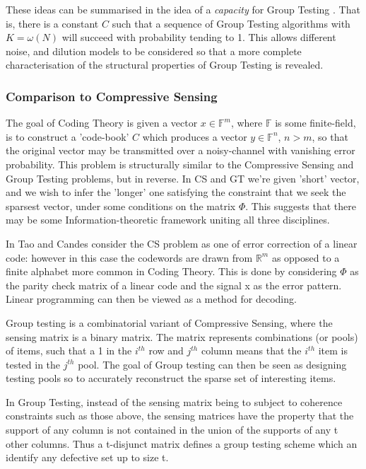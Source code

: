 \documentclass[conference]{IEEEtran}
\begin{document}
These ideas can be summarised in the idea of a \textit{capacity} for Group Testing \cite{Baldassini2013}. That is, there is a constant \(C\) such that a sequence of Group Testing algorithms with \( K = \omega\left(N\right)\) will succeed with probability tending to 1. This allows different noise, and dilution models to be considered so that a more complete characterisation of the structural properties of Group Testing is revealed.
 
\subsubsection{Comparison to Compressive Sensing}
The goal of Coding Theory is given a vector \(x \in \mathbb{F}^m\), where \(\mathbb{F}\) is some finite-field, is to construct a 'code-book' \(C\) which produces a vector \(y \in \mathbb{F}^n\), \(n > m\), so that the original vector may be transmitted over a noisy-channel with vanishing error probability. This problem is structurally similar to the Compressive Sensing and Group Testing problems, but in reverse. In CS and GT we're given 'short' vector, and we wish to infer the 'longer' one satisfying the constraint that we seek the sparsest vector, under some conditions on the matrix \(\Phi\). This suggests that there may be some Information-theoretic framework uniting all three disciplines. 

In \cite{Emma} Tao and Candes consider the CS problem as one of error correction of a linear code: however in this case the codewords are drawn from \(\mathbb{R}^m\) as opposed to a finite alphabet more common in Coding Theory. This is done by considering \(\Phi\) as the parity check matrix of a linear code and the signal x as the error pattern. Linear programming can then be viewed as a method for decoding. 

Group testing is a combinatorial variant of Compressive Sensing, where the sensing matrix is a binary matrix. The matrix represents combinations (or pools) of items, such that a 1 in the \(i^{th}\) row and \(j^{th}\) column means that  the \(i^{th}\) item is tested in the \(j^{th}\) pool. The goal of Group testing can then be seen as designing testing pools so to accurately reconstruct the sparse set of interesting items. 

In Group Testing, instead of the sensing matrix being to subject to coherence constraints such as those above, the sensing matrices have the property that the support of any column is not contained in the union of the supports of any t other columns. Thus a t-disjunct matrix defines a group testing scheme which an identify any defective set up to size t.
\end{document}
